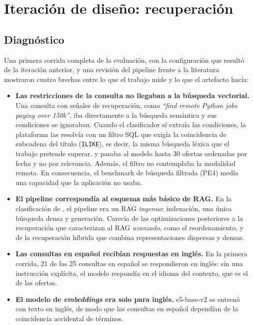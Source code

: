 \section{Iteración de diseño: recuperación}
\label{sec:art-iter-recuperacion}

\subsection{Diagnóstico}

Una primera corrida completa de la evaluación, con la configuración que resultó de la iteración anterior, y una revisión del pipeline frente a la literatura mostraron cuatro brechas entre lo que el trabajo mide y lo que el artefacto hacía:
\begin{itemize}
    \item \textbf{Las restricciones de la consulta no llegaban a la búsqueda vectorial.} Una consulta con señales de recuperación, como \textit{\enquote{find remote Python jobs paying over 150k}}, iba directamente a la búsqueda semántica y sus condiciones se ignoraban. Cuando el clasificador sí extraía las condiciones, la plataforma las resolvía con un filtro SQL que exigía la coincidencia de subcadena del título (\texttt{ILIKE}), es decir, la misma búsqueda léxica que el trabajo pretende superar, y pasaba al modelo hasta 30 ofertas ordenadas por fecha y no por relevancia. Además, el filtro no contemplaba la modalidad remota. En consecuencia, el benchmark de búsqueda filtrada (PE4) medía una capacidad que la aplicación no usaba.
    \item \textbf{El pipeline correspondía al esquema más básico de RAG.} En la clasificación de \citet{Gao2023}, el pipeline era un RAG \emph{ingenuo}: indexación, una única búsqueda densa y generación. Carecía de las optimizaciones posteriores a la recuperación que caracterizan al RAG \emph{avanzado}, como el reordenamiento, y de la recuperación híbrida que combina representaciones dispersas y densas.
    \item \textbf{Las consultas en español recibían respuestas en inglés.} En la primera corrida, 21 de las 25 consultas en español se respondieron en inglés: sin una instrucción explícita, el modelo respondía en el idioma del contexto, que es el de las ofertas.
    \item \textbf{El modelo de \textit{embeddings} era solo para inglés.} e5-base-v2 \citep{Wang2022E5} se entrenó con texto en inglés, de modo que las consultas en español dependían de la coincidencia accidental de términos.
\end{itemize}

